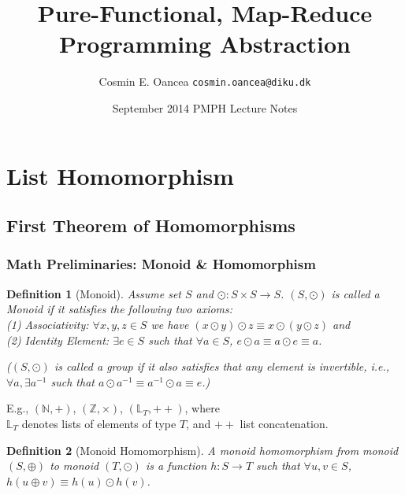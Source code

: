 \documentclass{beamer}
\title[Map-Reduce]{Pure-Functional, Map-Reduce\\Programming Abstraction}
\author[C.~Oancea]{Cosmin E. Oancea {\tt cosmin.oancea@diku.dk}}
\institute{Department of Computer Science (DIKU)\\University of Copenhagen}
\date[Sept 2014]{September 2014 PMPH Lecture Notes}
\newcommand{\emp}[1]{\textcolor{DikuRed}{ #1}}
\newtheorem{mydef}{Definition}
\begin{document}
\titleslide


\begin{frame}[fragile]
	\tableofcontents
\end{frame}


\section{List Homomorphism}

\subsection{First Theorem of Homomorphisms}

\begin{frame}[fragile,t]
\frametitle{Math Preliminaries: Monoid \& Homomorphism}

\begin{mydef}[Monoid]\label{MonoidDef}\vspace{-1ex}
Assume set $S$ and $\odot : S \times S \rightarrow S$.
\emp{$(S, \odot)$ is called a Monoid} if it satisfies the following two axioms:\\
\emp{(1) Associativity:} $\forall x,y,z\in S$ we have 
    $(x \odot y) \odot z \equiv x \odot (y \odot z)$ and\\
\emp{(2) Identity Element:} $\exists e \in S$ such that $\forall a \in S$, %
    $e \odot a \equiv a \odot e \equiv a$.\\\medskip

($(S,\odot)$ is called a group if it also satisfies that any element is 
    invertible, i.e., 
    $\forall a, \exists a^{-1}$ such that 
    $a\odot a^{-1}\equiv a^{-1}\odot a\equiv e$.)
\end{mydef}

E.g., $(\mathbb{N},+)$, $(\mathbb{Z},\times)$, $(\mathbb{L}_T,++)$, where\\
        $\mathbb{L}_T$ denotes lists of elements of type $T$,
        and $++$ list concatenation. 

\begin{mydef}[Monoid Homomorphism]\label{HomDef}\vspace{-1ex}
\emp{A monoid homomorphism} from monoid $(S,\oplus)$ to monoid $(T,\odot)$
is a function $h : S \rightarrow T$ such that $\forall u, v\in S$,
\emp{$h(u\oplus v) \equiv h(u)\odot h(v)$}.
\end{mydef}


\end{frame}
\end{document}
